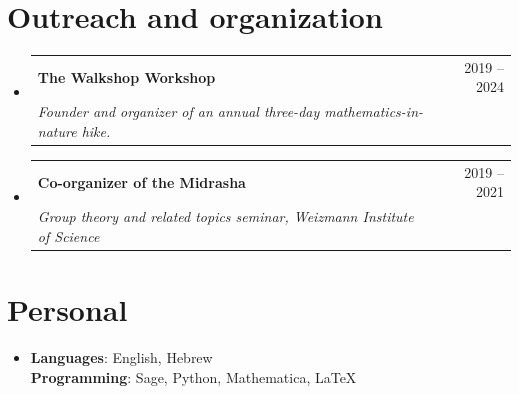 \documentclass[letterpaper,11pt]{article}
\makeatletter
\newcommand{\resumeSubheading}[4]{
  \vspace{-3pt}\item
    \begin{tabular*}{0.97\textwidth}[t]{l@{\extracolsep{\fill}}r}
      \textbf{#1} & #2 \\
      \textit{\small #3} & \textit{\small #4} \\
    \end{tabular*}\vspace{-10pt}
}
\newcommand{\resumeSubHeadingListStart}{\begin{itemize}[leftmargin=0.15in, label={}]}
\newcommand{\resumeSubHeadingListEnd}{\end{itemize}}
\makeatother
\begin{document}
\section{Outreach and organization}
\resumeSubHeadingListStart
    \resumeSubheading
        {The Walkshop Workshop}{2019 -- 2024}
        {Founder and organizer of an annual three-day mathematics-in-nature hike.}{}
    \resumeSubheading
        {Co-organizer of the Midrasha}{2019 -- 2021}
        {Group theory and related topics seminar, Weizmann Institute of Science}{}
\resumeSubHeadingListEnd


\enlargethispage{4\baselineskip}
\section{Personal}
\begin{itemize}[leftmargin=0.15in, label={}]
    \item \textbf{Languages}: English, Hebrew \\
    \textbf{Programming}: Sage, Python, Mathematica, \LaTeX
\end{itemize}
\end{document}
